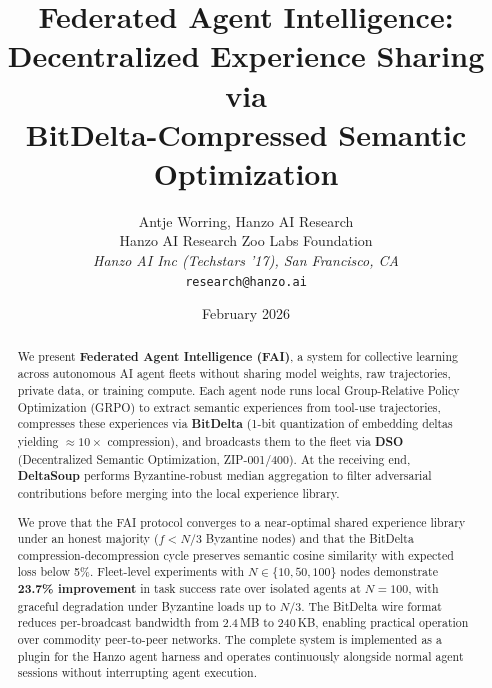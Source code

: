 \documentclass[11pt]{article}
\title{Federated Agent Intelligence:\\
Decentralized Experience Sharing via\\
BitDelta-Compressed Semantic Optimization}
\author{
    Antje Worring, Hanzo AI Research \\
    Hanzo AI Research \quad Zoo Labs Foundation\\
    \textit{Hanzo AI Inc (Techstars '17), San Francisco, CA}\\
    \texttt{research@hanzo.ai}
}
\date{February 2026}
\begin{document}
\hanzocoverpage

\begin{abstract}
We present \textbf{Federated Agent Intelligence (FAI)}, a system for
collective learning across autonomous AI agent fleets without sharing model
weights, raw trajectories, private data, or training compute. Each agent node
runs local Group-Relative Policy Optimization (GRPO) to extract
semantic experiences from tool-use trajectories, compresses these experiences
via \textbf{BitDelta} (1-bit quantization of embedding deltas yielding
${\approx}10\times$ compression), and broadcasts them to the fleet via
\textbf{DSO} (Decentralized Semantic Optimization, ZIP-001/400).
At the receiving end, \textbf{DeltaSoup} performs Byzantine-robust median
aggregation to filter adversarial contributions before merging into the local
experience library.

We prove that the FAI protocol converges to a near-optimal shared experience
library under an honest majority ($f < N/3$ Byzantine nodes) and that the
BitDelta compression-decompression cycle preserves semantic cosine similarity
with expected loss below 5\%. Fleet-level experiments with $N \in \{10, 50, 100\}$
nodes demonstrate \textbf{23.7\% improvement} in task success rate over isolated
agents at $N=100$, with graceful degradation under Byzantine loads up to $N/3$.
The BitDelta wire format reduces per-broadcast bandwidth from 2.4\,MB to 240\,KB,
enabling practical operation over commodity peer-to-peer networks. The complete
system is implemented as a plugin for the Hanzo agent harness and operates
continuously alongside normal agent sessions without interrupting agent execution.
\end{abstract}


















\end{document}
